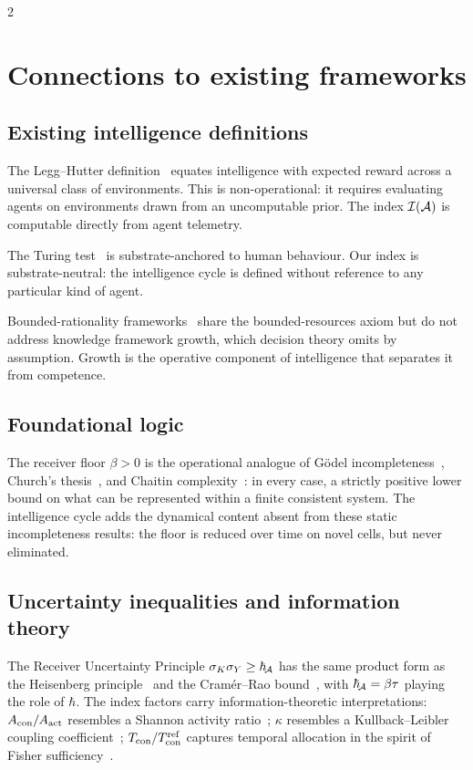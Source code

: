 \begin{multicols}{2}
\section{Connections to existing frameworks}
\label{sec:ch05-connections}

\subsection{Existing intelligence definitions}

The Legg--Hutter definition~\citep{legghutter2007,hutter2005} equates intelligence with
expected reward across a universal class of environments. This is non-operational: it
requires evaluating agents on environments drawn from an uncomputable prior. The index
$\mathcal{I}(\mathcal{A})$ is computable directly from agent telemetry.

The Turing test~\citep{turing1950} is substrate-anchored to human behaviour. Our index
is substrate-neutral: the intelligence cycle is defined without reference to any
particular kind of agent.

Bounded-rationality frameworks~\citep{simon1996,russellnorvig2020} share the
bounded-resources axiom but do not address knowledge framework growth, which decision
theory omits by assumption. Growth is the operative component of intelligence that
separates it from competence.

\subsection{Foundational logic}

The receiver floor $\beta > 0$ is the operational analogue of G\"{o}del
incompleteness~\citep{godel1931,tarski1933}, Church's thesis~\citep{church1936}, and
Chaitin complexity~\citep{chaitin1974}: in every case, a strictly positive lower bound on
what can be represented within a finite consistent system. The intelligence cycle adds
the dynamical content absent from these static incompleteness results: the floor is
reduced over time on novel cells, but never eliminated.

\subsection{Uncertainty inequalities and information theory}

The Receiver Uncertainty Principle $\sigma_K \sigma_Y \ge \hbar_{\!\mathcal{A}}$ has the same product
form as the Heisenberg principle~\citep{heisenberg1927,robertson1929} and the
Cram\'er--Rao bound~\citep{rao1945,cramer1946}, with $\hbar_{\!\mathcal{A}} = \beta\tau$ playing the
role of $\hbar$. The index factors carry information-theoretic interpretations:
$A_{\mathrm{con}}/A_{\mathrm{act}}$ resembles a Shannon activity ratio~\citep{shannon1948,coverthomas2006};
$\kappa$ resembles a Kullback--Leibler coupling coefficient~\citep{kullback1951};
$T_{\mathrm{con}}/T_{\mathrm{con}}^{\mathrm{ref}}$ captures temporal allocation in the spirit of Fisher
sufficiency~\citep{fisher1925}.


\end{multicols}
